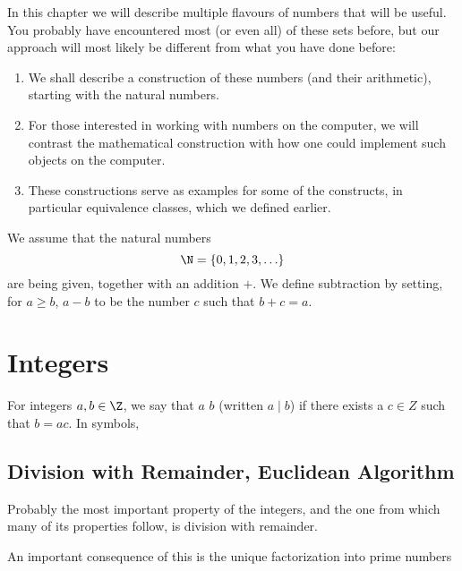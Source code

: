 In this chapter we will describe multiple flavours of numbers that will be
useful. You probably have encountered most (or even all) of these sets
before, but our approach will most likely be different from what you have
done before:
\begin{enumerate}
\item We shall describe a construction of these numbers (and their
arithmetic), starting with the natural numbers.
\item For those interested in working with numbers on the computer, we will
contrast the mathematical construction with how one could implement such
objects on the computer.
\item
These constructions serve as examples for some of the constructs, in
particular equivalence classes, which we defined earlier.
\end{enumerate}

We assume that the natural numbers
\[
\N=\{0,1,2,3,\ldots\}
\]
are being given, together with an addition $+$. We define subtraction by
setting, for $a\ge b$, $a-b$ to be the number $c$ such that
$b+c=a$.

\section{Integers}


\begin{defn}
For integers $a,b\in\Z$, we say that $a$  $b$ (written
$a\mid b$) if there
exists a $c\in Z$ such that $b=ac$. In symbols, 
\end{defn}

\subsection{Division with Remainder, Euclidean Algorithm}

Probably the most important property of the integers, and the one from which
many of its properties follow, is division with remainder. 

An important  consequence of this is the unique factorization into prime numbers

